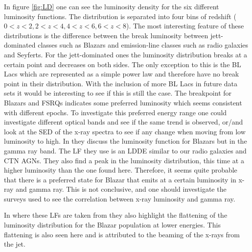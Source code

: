 In figure \ref{fig:LD} one can see the luminosity density for the six different luminosity functions. The distribution is 
separated into four bins of redshift ($0<z<2,2<z<4,4<z<6,6<z<8$). %
The most interesting feature of these distributions is the difference between the break luminosity between jett-dominated classes such as Blazars and emission-line classes such as radio galaxies and Seyferts.
For the jett-dominated ones the luminosity distribution breaks at a certain point and decreases on both sides. The only exception to this is the BL Lacs which are represented as a simple power law and therefore have no
break point in their distribution. With the inclusion of more BL Lacs in future data sets it would be interesting to see if this is still the case. %
The breakpoint for Blazars and FSRQs indicates some preferred 
luminosity which seems consistent with different epochs. To investigate this preferred energy range one could investigate different optical bands and see if the same trend is observed, or/and look at the SED of the x-ray 
spectra to see if any change when moving from low luminosity to high. 
In \cite{Narumoto_2006} they discuss the luminosity function for Blazars but in the gamma ray band. The LF they use is an LDDE similar to our radio galaxies and CTN AGNs. They also find a peak in the luminosity distribution, this time at a higher luminosity than the one found here.
Therefore, it seems quite probable that there is a preferred state for Blazar that emits at a certain luminosity in x-ray and gamma ray. This is not conclusive, and one should investigate the surveys used to see the correlation between x-ray luminosity and gamma ray. 

In \cite{Ajello_2009} where these LFs are taken 
from they also highlight the flattening of the luminosity distribution for the Blazar population at lower energies. This flattening is also seen here and is attributed to 
the beaming of the x-rays from the jet.  


